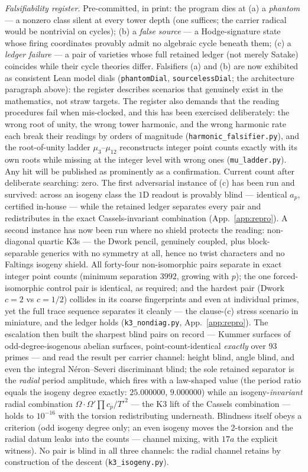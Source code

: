 \documentclass[11pt]{article}
\theoremstyle{definition}
\theoremstyle{remark}
\begin{document}
\noindent\emph{Falsifiability register.} Pre-committed, in print: the program
dies at (a) a \emph{phantom} --- a nonzero class silent at every tower depth
(one suffices; the carrier radical would be nontrivial on cycles); (b) a
\emph{false source} --- a Hodge-signature state whose firing coordinates
provably admit no algebraic cycle beneath them; (c) a \emph{ledger failure} ---
a pair of varieties whose full retained ledger (not merely Satake) coincides
while their cycle theories differ. Falsifiers (a) and (b) are now exhibited as
consistent Lean model dials (\texttt{phantomDial}, \texttt{sourcelessDial};
the architecture paragraph above): the register describes scenarios that
genuinely exist in the mathematics, not straw targets. The register also demands that the reading
procedures fail when mis-clocked, and this has been exercised deliberately:
the wrong root of unity, the wrong tower harmonic, and the wrong harmonic rate
each break their readings by orders of magnitude
(\texttt{harmonic\_falsifier.py}), and the root-of-unity ladder
$\mu_3$--$\mu_{12}$ reconstructs integer point counts exactly with its own
roots while missing at the integer level with wrong ones
(\texttt{mu\_ladder.py}). Any hit will be published as prominently as
a confirmation. Current count after deliberate searching: zero. The first
adversarial instance of (c) has been run and survived: across an isogeny class
the $1$D readout is provably blind --- identical $a_p$, certified in-house ---
while the retained ledger separates every pair and redistributes in the exact
Cassels-invariant combination (App.~\ref{app:repro}). A second instance has
now been run where no shield protects the reading: non-diagonal quartic K3s
--- the Dwork pencil, genuinely coupled, plus block-separable generics with no
symmetry at all, hence no twist characters and no Faltings isogeny shield.
All forty-four non-isomorphic pairs separate in exact integer point counts
(minimum separation $3992$, growing with $p$); the one forced-isomorphic
control pair is identical, as required; and the hardest pair (Dwork $c=2$ vs
$c=1/2$) collides in its coarse fingerprints and even at individual primes,
yet the full trace sequence separates it cleanly --- the clause-(c) stress
scenario in miniature, and the ledger holds (\texttt{k3\_nondiag.py},
App.~\ref{app:repro}). The escalation then built the sharpest blind pairs
on record --- Kummer surfaces of odd-degree-isogenous abelian surfaces,
point-count-identical \emph{exactly} over 93 primes --- and read the result
per carrier channel: height blind, angle blind, and even the integral
N\'eron--Severi discriminant blind; the sole retained separator is the
\emph{radial} period amplitude, which fires with a law-shaped value (the
period ratio equals the isogeny degree exactly: $25.000000$, $9.000000$)
while an isogeny-\emph{invariant} radial combination
$\Omega\!\cdot\!\Omega'\prod c_p/T'^2$ --- the K3 lift of the Cassels
combination --- holds to $10^{-16}$ with the torsion redistributing
underneath. Blindness itself obeys a criterion (odd isogeny degree only;
an even isogeny moves the 2-torsion and the radial datum leaks into the
counts --- channel mixing, with $17a$ the explicit witness). No pair is
blind in all three channels: the radial channel retains by construction of
the descent (\texttt{k3\_isogeny.py}).
\end{document}
